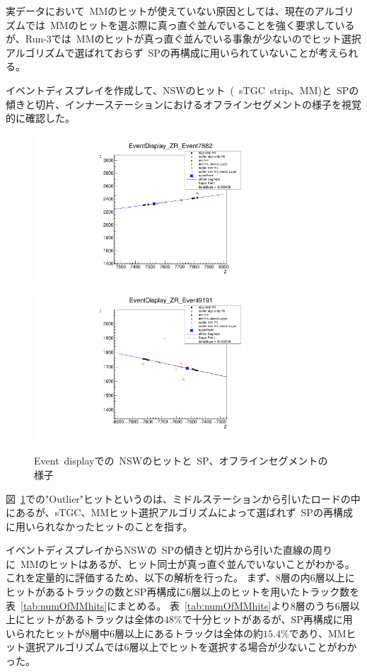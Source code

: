 実データにおいて~MMのヒットが使えていない原因としては、現在のアルゴリズムでは~MMのヒットを選ぶ際に真っ直ぐ並んでいることを強く要求しているが、Run-3では~MMのヒットが真っ直ぐ並んでいる事象が少ないのでヒット選択アルゴリズムで選ばれておらず~SPの再構成に用いられていないことが考えられる。

イベントディスプレイを作成して、NSWのヒット~(~sTGC~strip、MM)と~SPの傾きと切片、インナーステーションにおけるオフラインセグメントの様子を視覚的に確認した。

\begin{figure}[H]
      \centering
      \includegraphics[clip, width=8cm]{fig/5/EventDisplay_7882_ZR_withMM.pdf}
      \centering
      \includegraphics[clip, width=8cm]{fig/5/EventDisplay_9191_ZR_withMM.pdf}
  \caption{Event~displayでの~NSWのヒットと~SP、オフラインセグメントの様子}\label{fig:eventDisplay}
\end{figure}
図~\ref{fig:eventDisplay}での"Outlier"ヒットというのは、ミドルステーションから引いたロードの中にあるが、sTGC、MMヒット選択アルゴリズムによって選ばれず~SPの再構成に用いられなかったヒットのことを指す。

イベントディスプレイからNSWの~SPの傾きと切片から引いた直線の周りに~MMのヒットはあるが、ヒット同士が真っ直ぐ並んでいないことがわかる。
これを定量的に評価するため、以下の解析を行った。
まず、8層の内6層以上にヒットがあるトラックの数とSP再構成に6層以上のヒットを用いたトラック数を表~\ref{tab:numOfMMhits}にまとめる。
表~\ref{tab:numOfMMhits}より8層のうち6層以上にヒットがあるトラックは全体の$48\%$で十分ヒットがあるが、SP再構成に用いられたヒットが8層中6層以上にあるトラックは全体の約$15.4\%$であり、MMヒット選択アルゴリズムでは6層以上でヒットを選択する場合が少ないことがわかった。

